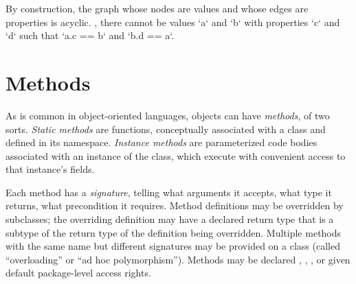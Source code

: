By construction, the graph whose nodes are values and whose edges are
properties is acyclic.  \Eg, there cannot be values \xcd`a` and \xcd`b` with
properties \xcd`c` and \xcd`d` such that \xcd`a.c == b` and \xcd`b.d == a`.


\label{PropertyCall}







\section{Methods}

As is common in object-oriented languages, objects can have {\em methods}, of
two sorts.  {\em Static methods} are functions, conceptually associated with a
class and defined in its namespace.  {\em Instance methods} are parameterized
code bodies associated with an instance of the class, which execute with
convenient access to that instance's fields. 

Each method has a {\em signature}, telling what arguments it accepts, what
type it returns, what precondition it requires. Method definitions may be
overridden by subclasses; the overriding definition may have a declared return
type that is a subtype of the return type of the definition being overridden.
Multiple methods with the same name but different signatures may be provided
on a class (called ``overloading'' or ``ad hoc polymorphism''). Methods may be
declared , , , or given default package-level access
rights.

